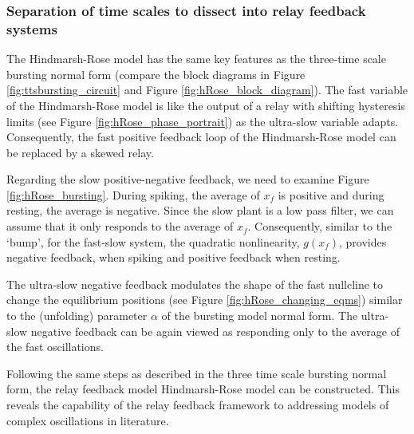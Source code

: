 \documentclass[a4paper, 12pt]{article}
\begin{document}
\subsubsection{Separation of time scales to dissect into relay feedback systems}
The Hindmarsh-Rose model has the same key features as the three-time scale bursting normal form (compare the block diagrams in Figure \ref{fig:ttsbursting_circuit} and Figure \ref{fig:hRose_block_diagram}). The fast variable of the Hindmarsh-Rose model is like the output of a relay with shifting hysteresis limits (see Figure \ref{fig:hRose_phase_portrait}) as the ultra-slow variable adapts. Consequently, the fast positive feedback loop of the Hindmarsh-Rose model can be replaced by a skewed relay. 

 Regarding the slow positive-negative feedback, we need to examine Figure \ref{fig:hRose_bursting}. During spiking, the average of $x_f$ is positive and during resting, the average is negative. Since the slow plant is a low pass filter, we can assume that it only responds to the average of $x_f$. Consequently, similar to the `bump', for the fast-slow system, the quadratic nonlinearity, $g(x_f)$, provides negative feedback, when spiking and positive feedback when resting.

The ultra-slow negative feedback modulates the shape of the fast nullcline to change the equilibrium positions (see Figure \ref{fig:hRose_changing_eqms}) similar to the (unfolding) parameter $\alpha$ of the bursting model normal form. The ultra-slow negative feedback can be again viewed as responding only to the average of the fast oscillations. 

Following the same steps as described in the three time scale bursting normal form, the relay feedback model Hindmarsh-Rose model can be constructed. This reveals the capability of the relay feedback framework to addressing models of complex oscillations in literature. 


\FloatBarrier
\clearpage
\end{document}
